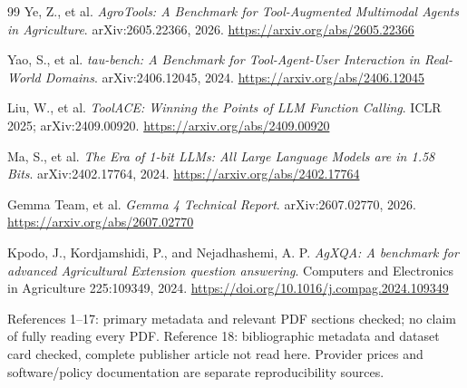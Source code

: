 \documentclass[10pt,a4paper,twocolumn]{article}
\begin{document}
\begin{thebibliography}{99}
Ye, Z., et al. \emph{AgroTools: A Benchmark for Tool-Augmented Multimodal Agents in Agriculture}. arXiv:2605.22366, 2026. \url{https://arxiv.org/abs/2605.22366}

Yao, S., et al. \emph{tau-bench: A Benchmark for Tool-Agent-User Interaction in Real-World Domains}. arXiv:2406.12045, 2024. \url{https://arxiv.org/abs/2406.12045}

Liu, W., et al. \emph{ToolACE: Winning the Points of LLM Function Calling}. ICLR 2025; arXiv:2409.00920. \url{https://arxiv.org/abs/2409.00920}

Ma, S., et al. \emph{The Era of 1-bit LLMs: All Large Language Models are in 1.58 Bits}. arXiv:2402.17764, 2024. \url{https://arxiv.org/abs/2402.17764}

Gemma Team, et al. \emph{Gemma 4 Technical Report}. arXiv:2607.02770, 2026. \url{https://arxiv.org/abs/2607.02770}

Kpodo, J., Kordjamshidi, P., and Nejadhashemi, A. P. \emph{AgXQA: A benchmark for advanced Agricultural Extension question answering}. Computers and Electronics in Agriculture 225:109349, 2024. \url{https://doi.org/10.1016/j.compag.2024.109349}
\end{thebibliography}
\noindent\footnotesize References 1--17: primary metadata and relevant PDF sections checked; no claim of fully reading every PDF. Reference 18: bibliographic metadata and dataset card checked, complete publisher article not read here. Provider prices and software/policy documentation are separate reproducibility sources.
\end{document}
